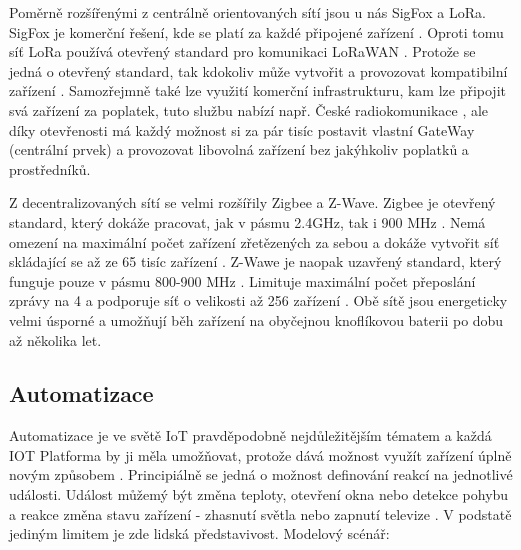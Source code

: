 Poměrně rozšířenými z centrálně orientovaných sítí jsou u nás SigFox a LoRa. SigFox je komerční řešení, kde se platí za každé připojené zařízení \cite{sigfox-price}. Oproti tomu síť LoRa používá otevřený standard pro komunikaci LoRaWAN \cite{lora}. Protože se jedná o otevřený standard, tak kdokoliv může vytvořit a provozovat kompatibilní zařízení \cite{lora}. Samozřejmně také lze využití komerční infrastrukturu, kam lze připojit svá zařízení za poplatek, tuto službu nabízí např. České radiokomunikace \cite{cra}, ale díky otevřenosti má každý možnost si za pár tisíc postavit vlastní GateWay (centrální prvek) a provozovat libovolná zařízení bez jakýhkoliv poplatků a prostředníků.

Z decentralizovaných sítí se velmi rozšířily Zigbee a Z-Wave. Zigbee je otevřený standard, který dokáže pracovat, jak v pásmu 2.4GHz, tak i 900 MHz \cite{zigbee}. Nemá omezení na maximální počet zařízení zřetězených za sebou a dokáže vytvořit síť skládající se až ze 65 tisíc zařízení \cite{zigbee}. Z-Wawe je naopak uzavřený standard, který funguje pouze v pásmu 800-900 MHz \cite{zwawe}. Limituje maximální počet přeposlání zprávy na 4 a podporuje síť o velikosti až 256 zařízení \cite{zwawe}. Obě sítě jsou energeticky velmi úsporné a umožňují běh zařízení na obyčejnou knoflíkovou baterii po dobu až několika let\cite{zigbee, zwawe}.

\subsection{Automatizace}
Automatizace je ve světě IoT pravděpodobně nejdůležitějším tématem a každá IOT Platforma by ji měla umožňovat, protože dává možnost využít zařízení úplně novým způsobem \cite{what-future-hold}. Principiálně se jedná o možnost definování reakcí na jednotlivé události. Událost můžemý být změna teploty, otevření okna nebo detekce pohybu a reakce změna stavu zařízení - zhasnutí světla nebo zapnutí televize \cite{what-future-hold}. V podstatě jediným limitem je zde lidská představivost. Modelový scénář:

